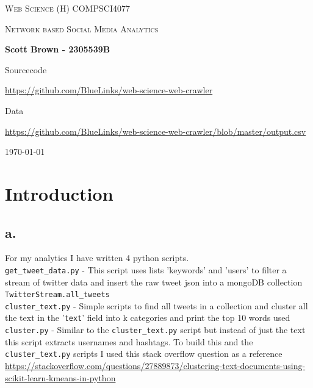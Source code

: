 \documentclass[10pt,a4paper]{article}
\begin{document}
\begin{titlepage}
	\centering
	{\scshape\LARGE Web Science (H) COMPSCI4077 \par}
	\vspace{1cm}
	{\scshape\Large Network based Social Media Analytics\par}
	\vspace{1.5cm}
	{\huge\bfseries Scott Brown - 2305539B \par}
	\vspace{2cm}
	{\Large Sourcecode\par}
	{\Large \url{https://github.com/BlueLinks/web-science-web-crawler}\par}
	\vspace{2cm}
	{\Large Data\par}
	{\Large \url{https://github.com/BlueLinks/web-science-web-crawler/blob/master/output.csv}\par}
	\vfill

	{\large \today\par}
	
\end{titlepage}

\section{Introduction}
\subsection*{a.}
For my analytics I have written 4 python scripts. \\

	\verb|get_tweet_data.py| - This script uses lists 'keywords' and 'users' to filter a stream of twitter data and insert the raw tweet json into a mongoDB collection \verb|TwitterStream.all_tweets| \\
	
	\verb|cluster_text.py| - Simple scripts to find all tweets in a collection and cluster all the text in the '\verb|text|' field into k categories and print the top 10 words used \\
	
	\verb|cluster.py| - Similar to the \verb|cluster_text.py| script but instead of just the text this script extracts usernames and hashtags. To build this and the \verb|cluster_text.py| scripts I used this stack overflow question as a reference \url{https://stackoverflow.com/questions/27889873/clustering-text-documents-using-scikit-learn-kmeans-in-python} \\
	
\end{document}
